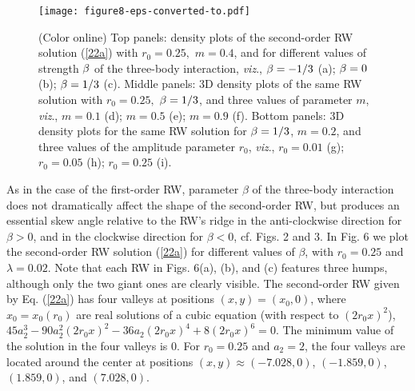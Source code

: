 \documentclass[preprintnumbers]{revtex4}
\begin{document}
\begin{figure}[tbp]
\centerline{\texttt{[image: figure8-eps-converted-to.pdf]}}
\caption{(Color online) Top panels: density plots of the second-order RW
solution (\protect\ref{22a}) with $r_{0}=0.25,$ $m=0.4$, and for different
values of strength $\protect\beta $ of the three-body interaction, \textit{%
viz}., $\protect\beta =-1/3$ (a); $\protect\beta =0$ (b); $\protect\beta %
=1/3 $ (c). Middle panels: 3D density plots of the same RW solution with $%
r_{0}=0.25,$ $\protect\beta =1/3$, and three values of parameter $m$,
\textit{viz}., $m=0.1$ (d); $m=0.5$ (e); $m=0.9$ (f). Bottom panels: 3D
density plots for the same RW solution for $\protect\beta =1/3$, $m=0.2$,
and three values of the amplitude parameter $r_{0}$, \textit{viz}., $%
r_{0}=0.01$ (g); $r_{0}=0.05$ (h); $r_{0}=0.25$ (i).}
\label{fig9}
\end{figure}

As in the case of the first-order RW, parameter $\beta $ of the three-body
interaction does not dramatically affect the shape of the second-order RW,
but produces an essential skew angle relative to the RW's ridge in the
anti-clockwise direction for $\beta >0$, and in the clockwise direction for $%
\beta <0$, cf. Figs. 2 and 3. In Fig. 6 we plot the second-order RW solution
(\ref{22a}) for different values of $\beta $, with $r_{0}=0.25$ and $\lambda
=0.02$. Note that each RW in Figs. 6(a), (b), and (c) features three humps,
although only the two giant ones are clearly visible. The second-order RW
given by Eq. (\ref{22a}) has four valleys at positions $\left( x,y\right)
=\left( x_{0},0\right) $, where $x_{0}=x_{0}(r_{0})$ are real solutions of a
cubic equation (with respect to $\left( 2r_{0}x\right) ^{2}$), $%
45a_{2}^{3}-90a_{2}^{2}\left( 2r_{0}x\right) ^{2}-36a_{2}\left(
2r_{0}x\right) ^{4}+8\left( 2r_{0}x\right) ^{6}=0$. The minimum value of the
solution in the four valleys is $0$. For $r_{0}=0.25$ and $a_{2}=2$, the
four valleys are located around the center at positions $\left( x,y\right)
\approx \left( -7.028,0\right) $, $\left( -1.859,0\right) $, $\left(
1.859,0\right) $, and $\left( 7.028,0\right) $.
\end{document}
